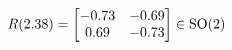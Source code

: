 \documentclass[preview]{standalone}
\begin{document}
\begin{align*}
\special{dvisvgm:raw <g id='unique000'>}R(2.38) = \begin{bmatrix} -0.73 & -0.69 \\ 0.69 & -0.73 \end{bmatrix} \in \text{SO}(2)\special{dvisvgm:raw </g>}
\end{align*}
\end{document}
